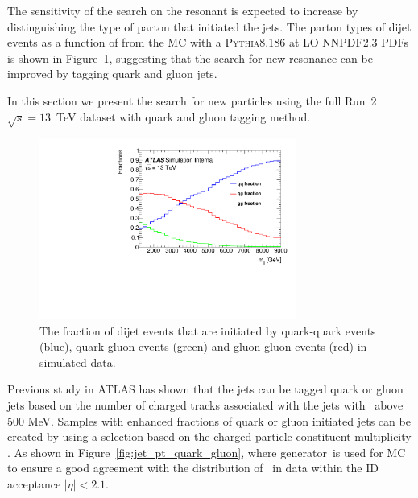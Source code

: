 The sensitivity of the search on the resonant is expected to increase by distinguishing the type of parton that initiated the jets. The parton types of dijet events as a function of \mjj from the MC with a  \textsc{Pythia8.186} at LO  NNPDF2.3 PDFs is shown in Figure~\ref{fig:quarkgluonfraction}, suggesting that the search for new resonance can be improved by tagging quark and gluon jets.


In this section we present the search for new particles using the full Run~2 $\sqrt{s} = 13$~TeV\xspace dataset with quark and gluon tagging method.


\begin{figure}[htb]
 \centering
\includegraphics[width=0.75\textwidth]{fig/tagging/Fractions_QCD.pdf}
\caption{The fraction of dijet events that are initiated by quark-quark events (blue), quark-gluon 
events (green) and gluon-gluon events (red) in simulated data.  \label{fig:quarkgluonfraction}}
\end{figure}


Previous study in ATLAS has shown that the jets can be tagged quark or gluon jets based on the number of charged tracks associated with the jets with \pt~above 500 MeV. Samples with enhanced fractions of quark or gluon initiated jets can be created by using a selection based on the charged-particle constituent multiplicity \ntrk. As shown in Figure~\ref{fig:jet_pt_quark_gluon}, where  generator~is used for MC to ensure a good agreement with the distribution of \ntrk~in data within the ID acceptance $|\eta|<2.1$.

